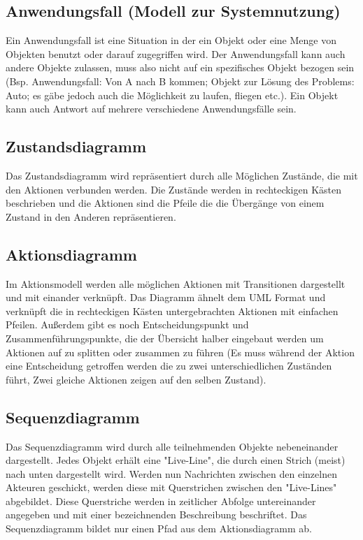 \subsection{Anwendungsfall (Modell zur Systemnutzung)}
Ein Anwendungsfall ist eine Situation in der ein Objekt oder eine Menge von Objekten benutzt oder darauf zugegriffen wird. Der Anwendungsfall kann auch andere Objekte zulassen, muss also nicht auf ein spezifisches Objekt bezogen sein (Bsp. Anwendungsfall: Von A nach B kommen; Objekt zur Lösung des Problems: Auto; es gäbe jedoch auch die Möglichkeit zu laufen, fliegen etc.). Ein Objekt kann auch Antwort auf mehrere verschiedene Anwendungsfälle sein.

\subsection{Zustandsdiagramm}
Das Zustandsdiagramm wird repräsentiert durch alle Möglichen Zustände, die mit den Aktionen verbunden werden. Die Zustände werden in rechteckigen Kästen beschrieben und die Aktionen sind die Pfeile die die Übergänge von einem Zustand in den Anderen repräsentieren.

\subsection{Aktionsdiagramm}
Im Aktionsmodell werden alle möglichen Aktionen mit Transitionen dargestellt und mit einander verknüpft. Das Diagramm ähnelt dem UML Format und verknüpft die in rechteckigen Kästen untergebrachten Aktionen mit einfachen Pfeilen. Außerdem gibt es noch Entscheidungspunkt und Zusammenführungspunkte, die der Übersicht halber eingebaut werden um Aktionen auf zu splitten oder zusammen zu führen (Es muss während der Aktion eine Entscheidung getroffen werden die zu zwei unterschiedlichen Zuständen führt, Zwei gleiche Aktionen zeigen auf den selben Zustand).

\subsection{Sequenzdiagramm}
Das Sequenzdiagramm wird durch alle teilnehmenden Objekte nebeneinander dargestellt. Jedes Objekt erhält eine "Live-Line", die durch einen Strich (meist) nach unten dargestellt wird. Werden nun Nachrichten zwischen den einzelnen Akteuren geschickt, werden diese mit Querstrichen zwischen den "Live-Lines" abgebildet. Diese Querstriche werden in zeitlicher Abfolge untereinander angegeben und mit einer bezeichnenden Beschreibung beschriftet. Das Sequenzdiagramm bildet nur einen Pfad aus dem Aktionsdiagramm ab.